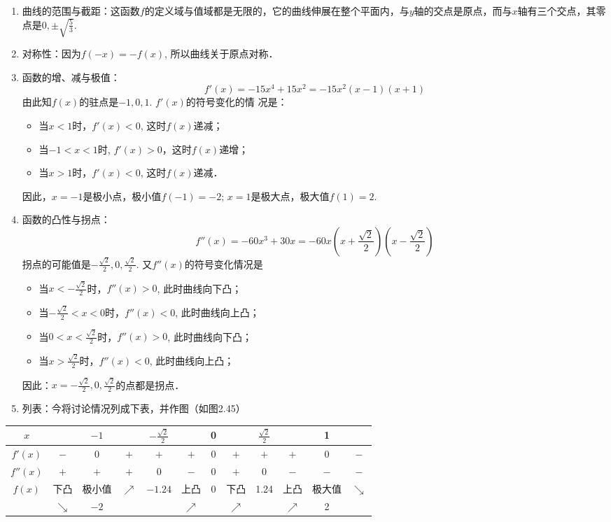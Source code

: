 \begin{solution}
\begin{enumerate}
\item 曲线的范围与截距：这函数$f$的定义域与值域都是无限的，它的曲线伸展在整个平面内，与$y$轴的交点是原点，而与$x$轴有三个交点，其零点是$0,\pm\sqrt{\frac{5}{3}}$.
\item 对称性：因为$f(-x)=-f(x)$, 所以曲线关于原点对称．
\item 函数的增、减与极值：
\[f' (x) =-15x^4+15x^2=-15x^2 (x-1) (x+1)\]
由此知$f(x)$的驻点是$-1, 0, 1$. $f'(x)$的符号变化的情
况是：
\begin{itemize}
    \item 当$x<1$时，$f'(x)<0$, 这时$f(x)$递减；
    \item 当$-1<x<1$时, $f'(x)>0$，这时$f(x)$递增；
    \item 当$x>1$时，$f'(x)<0$, 这时$f(x)$递减．
\end{itemize}
因此，$x=-1$是极小点，极小值$f(-1)=-2$; $x=1$是极大点，极大值$f(1)=2$.
\item 函数的凸性与拐点：
\[f''(x)=-60x^3+30x=-60x\left(x+\frac{\sqrt{2}}{2}\right)\left(x-\frac{\sqrt{2}}{2}\right)\]
拐点的可能值是$-\frac{\sqrt{2}}{2},0,\frac{\sqrt{2}}{2}$. 又$f''(x)$的符号变化情况是
\begin{itemize}
    \item 当$x<-\frac{\sqrt{2}}{2}$时，$f''(x)>0$, 此时曲线向下凸；
    \item 当$-\frac{\sqrt{2}}{2}<x<0$时，$f''(x)<0$, 此时曲线向上凸；
    \item 当$0<x<\frac{\sqrt{2}}{2}$时，$f''(x)>0$, 此时曲线向下凸；
    \item 当$x>\frac{\sqrt{2}}{2}$时，$f''(x)<0$, 此时曲线向上凸；
\end{itemize}
因此：$x=-\frac{\sqrt{2}}{2},0,\frac{\sqrt{2}}{2}$的点都是拐点．

\item 列表：今将讨论情况列成下表，并作图（如图2.45）
\end{enumerate}    
\begin{center}\small
    \begin{tabular}{cccccccccccc}
    \hline
    $x$ & &$-1$&&$-\frac{\sqrt{2}}{2}$&&0&&$\frac{\sqrt{2}}{2}$&&1\\
    \hline
    $f'(x)$& $-$ & 0&$+$&$+$&$+$&0&$+$&$+$&$+$&0&$-$\\
    $f''(x)$&$+$&$+$&$+$&0&$-$&0&$+$&0&$-$&$-$&$-$\\
    $f(x)$&下凸&极小值& $\nearrow$  & $-1.24$&上凸 & 0& 下凸 &1.24& 上凸 & 极大值 & $\searrow$  \\
    & $\searrow $ &$-2$&&&$\nearrow $&&$\nearrow $&&$\nearrow $&2\\
    \hline
    \end{tabular}
    \end{center}
    

\end{solution}
